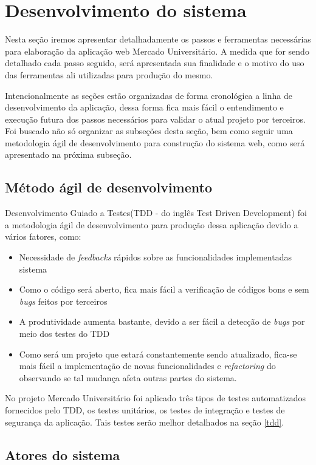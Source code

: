 \chapter{Desenvolvimento do sistema}
\label{chap:etapas_desenvolvimento}

Nesta seção iremos apresentar detalhadamente os passos e ferramentas necessárias para elaboração da aplicação web Mercado Universitário. A medida que for sendo detalhado cada passo seguido, será apresentada sua finalidade e o motivo do uso das ferramentas ali utilizadas para produção do mesmo. \par
Intencionalmente as seções estão organizadas de forma cronológica a linha de desenvolvimento da aplicação, dessa forma fica mais fácil o entendimento e execução futura dos passos necessários para validar o atual projeto por terceiros. Foi buscado não só organizar as subseções desta seção, bem como seguir uma metodologia ágil de desenvolvimento para construção do sistema web, como será apresentado na próxima subseção.

\section{Método ágil de desenvolvimento}

Desenvolvimento Guiado a Testes(TDD - do inglês Test Driven Development) foi a metodologia ágil de desenvolvimento para produção dessa aplicação devido a vários fatores, como:
\begin{itemize}  
\item Necessidade de \textit{feedbacks} rápidos sobre as funcionalidades implementadas sistema
\item Como o código será aberto, fica mais fácil a verificação de códigos bons e sem \textit{bugs} feitos por terceiros
\item A produtividade aumenta bastante, devido a ser fácil a detecção de \textit{bugs} por meio dos testes do TDD
\item Como será um projeto que estará constantemente sendo atualizado, fica-se mais fácil a implementação de novas funcionalidades e \textit{refactoring} do observando se tal mudança afeta outras partes do sistema.
\end{itemize}
No projeto Mercado Universitário foi aplicado três tipos de testes automatizados fornecidos pelo TDD, os testes unitários, os testes de integração e testes de segurança da aplicação. Tais testes serão melhor detalhados na seção \ref{tdd}.

\section{Atores do sistema}

